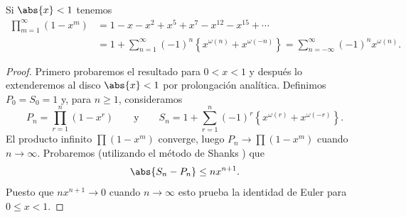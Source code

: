     \begin{teorema}\label{teo:14-3}
        Si $\abs{x}<1$ tenemos
        \begin{align*}
            \prod_{m=1}^{\infty}(1-x^m)&=1-x-x^2+x^5+x^7-x^{12}-x^{15}+\cdots\\
            &=1+\sum_{n=1}^{\infty}(-1)^n\left\{x^{\omega(n)}+x^{\omega(-n)}\right\}=\sum_{n=-\infty}^{\infty}(-1)^nx^{\omega(n)}.
        \end{align*}
    \end{teorema}

    \begin{proof}
        Primero probaremos el resultado para $0<x<1$ y después lo extenderemos al disco
        $\abs{x}<1$ por prolongación analítica. Definimos $P_0=S_0=1$ y, para $n\geq1$,
        consideramos
        \begin{equation*}
            P_n=\prod_{r=1}^{n}(1-x^r)\qquad\text{y}\qquad S_n=1+\sum_{r=1}^{n}(-1)^r\left\{x^{\omega(r)}+x^{\omega(-r)}\right\}.
        \end{equation*}
        El producto infinito $\prod(1-x^m)$ converge, luego $P_n\to\prod(1-x^m)$ cuando
        $n\to\infty$. Probaremos (utilizando el método de Shanks \cite{shanks1951}) que
        \begin{equation}\label{eq:14-6}
            \abs{S_n-P_n}\leq nx^{n+1}.
        \end{equation}
        Puesto que $nx^{n+1}\to0$ cuando $n\to\infty$ esto prueba la identidad de Euler para
        $0\leq x<1$.


\end{proof}
